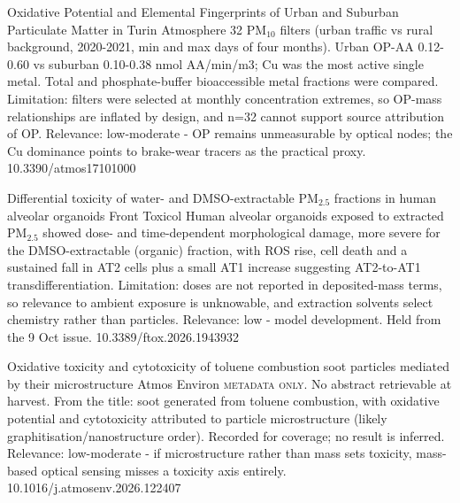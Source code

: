 \documentclass[10pt]{article}
\begin{document}
\par{}\baselineskip{}\baselineskip
{}

{Oxidative Potential and Elemental Fingerprints of Urban and Suburban Particulate Matter in Turin}
{Atmosphere}
{32 PM$_{10}$ filters (urban traffic vs rural background, 2020-2021, min and max days of four months). Urban OP-AA 0.12-0.60 vs suburban 0.10-0.38 nmol AA/min/m3; Cu was the most active single metal. Total and phosphate-buffer bioaccessible metal fractions were compared. Limitation: filters were selected at monthly concentration extremes, so OP-mass relationships are inflated by design, and n=32 cannot support source attribution of OP. Relevance: low-moderate - OP remains unmeasurable by optical nodes; the Cu dominance points to brake-wear tracers as the practical proxy.}
{10.3390/atmos17101000}

{Differential toxicity of water- and DMSO-extractable PM$_{2.5}$ fractions in human alveolar organoids}
{Front Toxicol}
{Human alveolar organoids exposed to extracted PM$_{2.5}$ showed dose- and time-dependent morphological damage, more severe for the DMSO-extractable (organic) fraction, with ROS rise, cell death and a sustained fall in AT2 cells plus a small AT1 increase suggesting AT2-to-AT1 transdifferentiation. Limitation: doses are not reported in deposited-mass terms, so relevance to ambient exposure is unknowable, and extraction solvents select chemistry rather than particles. Relevance: low - model development. Held from the 9 Oct issue.}
{10.3389/ftox.2026.1943932}

{Oxidative toxicity and cytotoxicity of toluene combustion soot particles mediated by their microstructure}
{Atmos Environ}
{\textsc{metadata only.} No abstract retrievable at harvest. From the title: soot generated from toluene combustion, with oxidative potential and cytotoxicity attributed to particle microstructure (likely graphitisation/nanostructure order). Recorded for coverage; no result is inferred. Relevance: low-moderate - if microstructure rather than mass sets toxicity, mass-based optical sensing misses a toxicity axis entirely.}
{10.1016/j.atmosenv.2026.122407}

\par{}\baselineskip{}\baselineskip
{}
\end{document}
